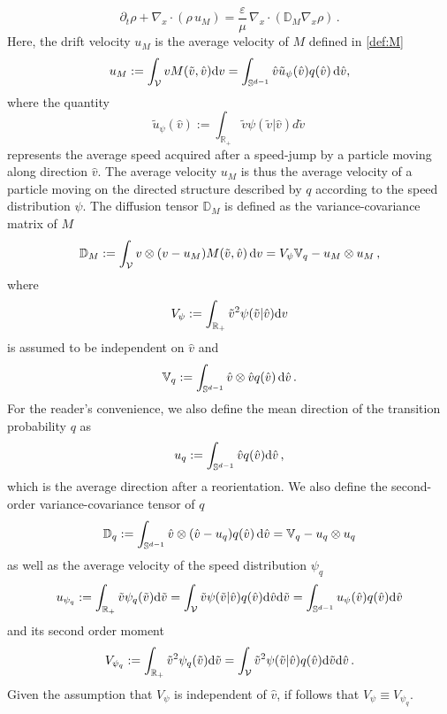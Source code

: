 \documentclass[a4paper]{article}
\theoremstyle{Theorem}\newtheorem{proposition}{Proposition}[section]
\theoremstyle{Remark}\newtheorem{remark}{Remark}[section]
\theoremstyle{Theorem}\newtheorem{theorem}{Theorem}[section]
\newcommand{\R}{\mathbb{R}}
\newcommand{\hv}{\hat{v}}
\newcommand{\tv}{\tilde{v}}
\newcommand{\intS}{\int_{\mathbb{S}^{d-1}}}
\newcommand{\intR}{\int_{\R_+}}
\newcommand{\intV}{\int_{\mathcal{V}}}
\begin{document}
\begin{equation}\label{macro1_govern_dep}
    \partial_t \rho + \nabla_x \cdot \left(\rho \, u_M \right)= \dfrac{\varepsilon}{\mu} \, \nabla_x \cdot(\mathbb{D}_M\nabla_x \rho)\,.
\end{equation}
Here, the drift velocity $u_M$ is the average velocity of $M$ defined in \eqref{def:M} 
\begin{equation}\label{u_M}
    u_M:=\intV vM(\tv,\hv){\rm d}v=\intS  \hv \tilde{u}_{\psi}(\hv) q(\hv) \, {\rm d} \hv,
\end{equation}
where the quantity
\begin{equation}\label{u_psi}
    \tilde{u}_{\psi}(\hv):= \intR \tv\psi(\tv|\hv)d\tv\,
\end{equation}
represents the average speed acquired after a speed-jump by a particle moving along direction $\hv$. The average velocity $u_M$ is thus the average velocity of a particle moving on the directed structure described by $q$ according to the speed distribution $\psi$. The diffusion tensor $\mathbb{D}_M$ is defined as the variance-covariance matrix of $M$
\begin{equation*}\label{D_M}
\mathbb{D}_M:=\intV 
v\otimes(v-u_M)M(\tv,\hv)\,{\rm d}v=V_\psi \mathbb{V}_q-u_M\otimes u_M \,,
\end{equation*}
where 
\begin{equation}\label{V_psi}
    V_{\psi}:=\intR \tv^2\psi(\tv|\hv){\rm d}v
\end{equation}
is assumed to be independent on $\hv$ and
\begin{equation*}\label{V_q}
   \mathbb{V}_q:=\intS \hv\otimes\hv q(\hv)\,{\rm d}\hv\,. %
\end{equation*}
For the reader’s convenience, we also define the mean direction of the transition probability $q$ as
\begin{equation}\label{u_q}
    u_q:=\intS \hv q(\hv){\rm d}\hv\,, %
\end{equation}
which is the average direction after a reorientation. We also define the second-order variance-covariance tensor of $q$
\begin{equation}\label{mattD_q}
\mathbb{D}_q := \intS   \hv\otimes(\hv-u_q)q(\hv) \, {\rm d} \hv=\mathbb{V}_q-u_q\otimes u_q
\end{equation}
as well as the average velocity of the speed distribution $\psi_q$ 
\begin{equation}\label{u_psiq}
    u_{\psi_q}:=\intR \tv \psi_q(\tv){\rm d}\tv=\intV\tv\psi(\tv|\hv)q(\hv){\rm d}\hv{\rm d}\tv=\intS u_\psi(\hv)q(\hv){\rm d}\hv %
\end{equation}
and its second order moment
\begin{equation}\label{V_psiq}
    V_{\psi_q}:=\intR \tv^2\psi_q(\tv){\rm d}\tv=\intV\tv^2\psi(\tv|\hv)q(\hv){\rm d}\tv{\rm d}\hv\,. %
\end{equation}
Given the assumption that $V_\psi$ is independent of $\hv$, if follows that $V_\psi\equiv V_{\psi_q}$. 
\end{document}

